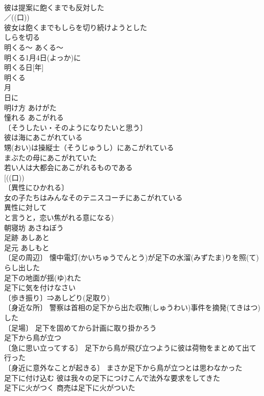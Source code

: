 \documentclass[8pt]{extreport}
\begin{document}
\begin{CJK}{UTF8}{min}
\\	彼は提案に飽くまでも反対した 
\\	／((口)) 
\\	彼女は飽くまでもしらを切り続けようとした 
\\	しらを切る 
\\	明くる～	あくる～	
\\	明くる1月4日(よっか)に 
\\	明くる日[年] 
\\	明くる 
\\	月 
\\	日に 
\\	明け方	あけがた	
\\	憧れる	あこがれる	
\\	〔そうしたい・そのようになりたいと思う〕
\\	彼は海にあこがれている 
\\	甥(おい)は操縦士（そうじゅうし）にあこがれている 
\\	まぶたの母にあこがれていた 
\\	若い人は大都会にあこがれるものである 
\\	[((口))
\\	〔異性にひかれる〕　
\\	女の子たちはみんなそのテニスコーチにあこがれている 
\\	異性に対して
\\	と言うと，恋い焦がれる意になる)
\\	朝寝坊	あさねぼう	
\\	足跡	あしあと	
\\	足元	あしもと	
\\	〔足の周辺〕 懐中電灯(かいちゅうでんとう)が足下の水溜(みずたま)りを照(て)らし出した 
\\	足下の地面が揺(ゆ)れた 
\\	足下に気を付けなさい 
\\	〔歩き振り〕⇒あしどり(足取り)
\\	〔身近な所〕 警察は首相の足下から出た収賄(しゅうわい)事件を摘発(てきはつ)した 
\\	〔足場〕 足下を固めてから計画に取り掛かろう 
\\	足下から鳥が立つ 
\\	〔急に思い立ってする〕 足下から鳥が飛び立つように彼は荷物をまとめて出て行った 
\\	〔身近に意外なことが起きる〕 まさか足下から鳥が立つとは思わなかった 
\\	足下に付け込む 彼は我々の足下につけこんで法外な要求をしてきた 
\\	足下に火がつく 商売は足下に火がついた 

\end{CJK}
\end{document}
